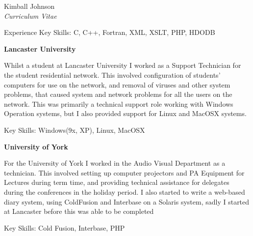 \documentclass[10pt]{article}
\begin{document}
\begin{cv}{Kimball Johnson\\{\large \itshape Curriculum Vitae}}
\begin{cvlist}{Experience}
	Key Skills: C, C++, Fortran, XML, XSLT, PHP, HDODB
    \item \textbf{Lancaster University}

    Whilst a student at Lancaster University I worked as a Support Technician for
    the student residential network. This involved configuration of students' 
    computers for use on the network, and removal of viruses and other system
    problems, that caused system and network problems for all the users on the network.  
    This was primarily a technical support role working with Windows Operation 
    systems, but I also provided support for Linux and MacOSX systems.

	Key Skills: Windows(9x, XP), Linux, MacOSX
    \item \textbf{University of York}

    For the University of York I worked in the Audio Visual Department as a 
    technician. This involved setting up computer projectors and PA Equipment for 
    Lectures during term time, and providing technical assistance for delegates 
    during the conferences in the holiday period. I also started to write a 
    web-based diary system, using ColdFusion and Interbase on a Solaris
    system, sadly I started at Lancaster before this was able to be completed

 	Key Skills: Cold Fusion, Interbase, PHP




\end{cvlist}
\end{cv}
\end{document}
